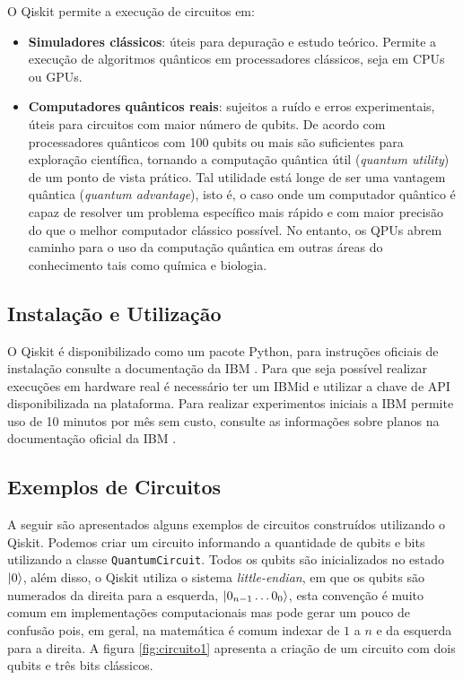 O Qiskit permite a execução de circuitos em:
\begin{itemize}
    \item \textbf{Simuladores clássicos}: úteis para depuração e estudo teórico. Permite a execução de algoritmos quânticos em processadores clássicos, seja em CPUs ou GPUs.
    \item \textbf{Computadores quânticos reais}: sujeitos a ruído e erros experimentais, úteis para circuitos com maior número de qubits. De acordo com \cite{articlequ} processadores quânticos com 100 qubits ou mais são suficientes para exploração científica, tornando a computação quântica útil (\emph{quantum utility}) de um ponto de vista prático. Tal utilidade está longe de ser uma vantagem quântica (\emph{quantum advantage}), isto é, o caso onde um computador quântico é capaz de resolver um problema específico mais rápido e com maior precisão do que o melhor computador clássico possível. No entanto, os QPUs abrem caminho para o uso da computação quântica em outras áreas do conhecimento tais como química e biologia.
\end{itemize}

\subsection{Instalação e Utilização}

O Qiskit é disponibilizado como um pacote Python, para instruções oficiais de instalação consulte a documentação da IBM \cite{ibm2025installqiskit}. Para que seja possível realizar execuções em hardware real é necessário ter um IBMid e utilizar a chave de API disponibilizada na plataforma. Para realizar experimentos iniciais a IBM permite uso de 10 minutos por mês sem custo, consulte as informações sobre planos na documentação oficial da IBM \cite{ibm2025quantumpricing}.

\subsection{Exemplos de Circuitos}

A seguir são apresentados alguns exemplos de circuitos construídos utilizando o Qiskit. Podemos criar um circuito informando a quantidade de qubits e bits utilizando a classe \texttt{QuantumCircuit}. Todos os qubits são inicializados no estado $\ket{0}$, além disso, o Qiskit utiliza o sistema \textit{little-endian}, em que os qubits são numerados da direita para a esquerda, $\ket{0_{n-1}\dotso 0_0}$, esta convenção é muito comum em implementações computacionais mas pode gerar um pouco de confusão pois, em geral, na matemática é comum indexar de $1$ a $n$ e da esquerda para a direita. A figura \ref{fig:circuito1} apresenta a criação de um circuito com dois qubits e três bits clássicos.

